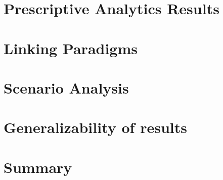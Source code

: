 \documentclass[../thesis.tex]{subfiles}
\begin{document}
\section{Prescriptive Analytics Results}

\section{Linking Paradigms}

\section{Scenario Analysis}
\section{Generalizability of results}

\section{Summary}
\end{document}
